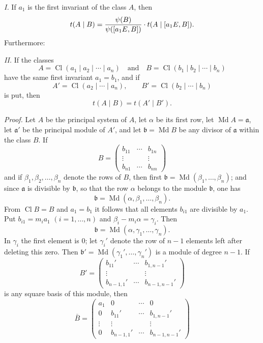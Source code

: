 \documentclass[11pt,a4paper]{article}
\newcommand{\Cl}{\operatorname{Cl}}
\newcommand{\Md}{\operatorname{Md}}
\begin{document}
\emph{I.} If $a_1$ is the first invariant of the class $A$, then
\[
 t(A\mid B)={\psi(B)\over\psi([a_1E,B])}\cdot t(A\mid [a_1E,B]).
\]
Furthermore:

\emph{II.} If the classes
\[
 A=\Cl(a_1\mid a_2\mid\cdots\mid a_n)
 \quad\text{and}\quad
 B=\Cl(b_1\mid b_2\mid\cdots\mid b_n)
\]
have the same first invariant $a_1=b_1$, and if
\[
 A'=\Cl(a_2\mid\cdots\mid a_n),
 \qquad
 B'=\Cl(b_2\mid\cdots\mid b_n)
\]
is put, then
\[
 t(A\mid B)=t(A'\mid B').
\]

\emph{Proof.} Let $A$ be the principal system of $A$, let $\alpha$ be its first row, let $\Md A=\mathfrak a$, let $\mathfrak a'$ be the principal module of $A'$, and let $\mathfrak b=\Md B$ be any divisor of $\mathfrak a$ within the class $B$. If
\[
 B=\begin{pmatrix}
 b_{11}&\cdots&b_{1n}\\
 \vdots&&\vdots\\
 b_{n1}&\cdots&b_{nn}
 \end{pmatrix}
\]
and if $\beta_1,\beta_2,\ldots,\beta_n$ denote the rows of $B$, then first $\mathfrak b=\Md(\beta_1,\ldots,\beta_n)$; and since $\mathfrak a$ is divisible by $\mathfrak b$, so that the row $\alpha$ belongs to the module $\mathfrak b$, one has
\[
 \mathfrak b=\Md(\alpha,\beta_1,\ldots,\beta_n).
\]
From $\Cl B=B$ and $a_1=b_1$ it follows that all elements $b_{i1}$ are divisible by $a_1$. Put $b_{i1}=m_i a_1$ $(i=1,\ldots,n)$ and $\beta_i-m_i\alpha=\gamma_i$. Then
\[
 \mathfrak b=\Md(\alpha,\gamma_1,\ldots,\gamma_n).
\]
In $\gamma_i$ the first element is $0$; let $\gamma_i'$ denote the row of $n-1$ elements left after deleting this zero. Then $\mathfrak b'=\Md(\gamma_1',\ldots,\gamma_n')$ is a module of degree $n-1$. If
\begin{equation}
 B'=\begin{pmatrix}
 b_{11}'&\cdots&b_{1,n-1}'\\
 \vdots&&\vdots\\
 b_{n-1,1}'&\cdots&b_{n-1,n-1}'
 \end{pmatrix}
\tag{3}
\end{equation}
is any square basis of this module, then
\begin{equation}
 \bar B=\begin{pmatrix}
 a_1&0&\cdots&0\\
 0&b_{11}'&\cdots&b_{1,n-1}'\\
 \vdots&\vdots&&\vdots\\
 0&b_{n-1,1}'&\cdots&b_{n-1,n-1}'
 \end{pmatrix}
\tag{4}
\end{equation}
\end{document}
